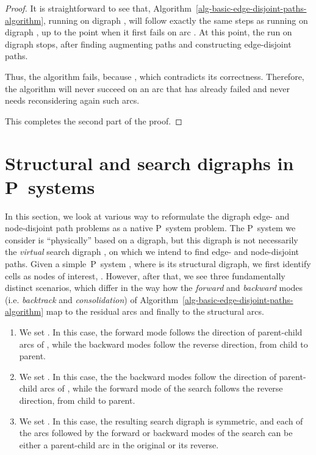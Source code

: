 \documentclass[preliminary,copyright,creativecommons]{eptcs}
\theoremstyle{remark}
\begin{document}
\begin{proof}
It is straightforward to see that, Algorithm~\ref{alg-basic-edge-disjoint-paths-algorithm}, 
running on digraph , will follow exactly the same steps as running on digraph , 
up to the point when it first fails on arc .
At this point, the run on digraph  stops, after finding  augmenting paths
and constructing  edge-disjoint paths.

Thus, the algorithm fails, because , which contradicts its correctness.
Therefore, the algorithm will never succeed on an arc that has already failed and
never needs reconsidering again such arcs. 

This completes the second part of the proof. 
\end{proof}


\section{Structural and search digraphs in P~systems}
\label{sec-structural-vs-search-digraph}

In this section, we look at various way to reformulate 
the digraph edge- and node-disjoint path problems as a native P~system problem.
The P~system we consider is ``physically'' based on a digraph,
but this digraph is not necessarily the \emph{virtual} search digraph 
, on which we intend to find edge- and node-disjoint paths.
Given a simple~P~system , where  is its structural digraph,
we first identify cells as nodes of interest, . 
However, after that, we see three fundamentally distinct scenarios,
which differ in the way how the \emph{forward} and \emph{backward} modes 
(i.e. \emph{backtrack} and \emph{consolidation}) of Algorithm~\ref{alg-basic-edge-disjoint-paths-algorithm} map to the residual arcs and finally to the structural arcs. 

\begin{enumerate}
\item We set . In this case,
the forward mode follows the direction of parent-child arcs of ,
while the backward modes follow the reverse direction,
from child to parent.
\item We set . In this case,
the the backward modes follow the direction of parent-child arcs of ,
while the forward mode of the search follows the reverse direction,
from child to parent.
\item We set . In this case,
the resulting search digraph is symmetric, 
and each of the arcs followed by the forward or backward modes of the search
can be either a parent-child arc in the original  or its reverse.
\end{enumerate}
\end{document}
